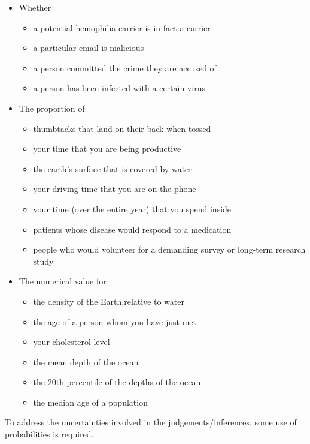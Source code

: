 \documentclass[]{book}
\providecommand{\tightlist}{%
  \setlength{\itemsep}{0pt}\setlength{\parskip}{0pt}}
\begin{document}
\begin{itemize}
\tightlist
\item
  Whether

  \begin{itemize}
  \tightlist
  \item
    a potential hemophilia carrier is in fact a carrier
  \item
    a particular email is malicious
  \item
    a person committed the crime they are accused of
  \item
    a person has been infected with a certain virus
  \end{itemize}
\item
  The proportion of

  \begin{itemize}
  \tightlist
  \item
    thumbtacks that land on their back when tossed
  \item
    your time that you are being productive
  \item
    the earth's surface that is covered by water
  \item
    your driving time that you are on the phone
  \item
    your time (over the entire year) that you spend inside
  \item
    patients whose disease would respond to a medication
  \item
    people who would volunteer for a demanding survey or long-term research study
  \end{itemize}
\item
  The numerical value for

  \begin{itemize}
  \tightlist
  \item
    the density of the Earth,relative to water
  \item
    the age of a person whom you have just met
  \item
    your cholesterol level
  \item
    the mean depth of the ocean
  \item
    the 20th percentile of the depths of the ocean
  \item
    the median age of a population
  \end{itemize}
\end{itemize}

To address the uncertainties involved in the judgements/inferences, some use of probabilities is required.
\end{document}
